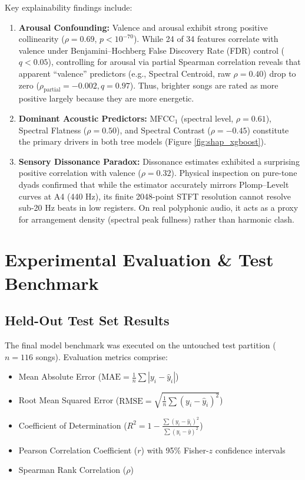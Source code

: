 \documentclass[conference]{IEEEtran}
\begin{document}
Key explainability findings include:
\begin{enumerate}
    \item \textbf{Arousal Confounding:} Valence and arousal exhibit strong positive collinearity ($\rho = 0.69$, $p < 10^{-70}$). While 24 of 34 features correlate with valence under Benjamini--Hochberg False Discovery Rate (FDR) control ($q < 0.05$), controlling for arousal via partial Spearman correlation reveals that apparent ``valence'' predictors (e.g., Spectral Centroid, raw $\rho = 0.40$) drop to zero ($\rho_{\text{partial}} = -0.002, q = 0.97$). Thus, brighter songs are rated as more positive largely because they are more energetic.
    \item \textbf{Dominant Acoustic Predictors:} $\text{MFCC}_1$ (spectral level, $\rho = 0.61$), Spectral Flatness ($\rho = 0.50$), and Spectral Contrast ($\rho = -0.45$) constitute the primary drivers in both tree models (Figure \ref{fig:shap_xgboost}).
    \item \textbf{Sensory Dissonance Paradox:} Dissonance estimates exhibited a surprising positive correlation with valence ($\rho = 0.32$). Physical inspection on pure-tone dyads confirmed that while the estimator accurately mirrors Plomp--Levelt curves at A4 (440 Hz), its finite 2048-point STFT resolution cannot resolve sub-20 Hz beats in low registers. On real polyphonic audio, it acts as a proxy for arrangement density (spectral peak fullness) rather than harmonic clash.
\end{enumerate}

\section{Experimental Evaluation \& Test Benchmark}

\subsection{Held-Out Test Set Results}
The final model benchmark was executed on the untouched test partition ($n = 116$ songs). Evaluation metrics comprise:
\begin{itemize}
    \item Mean Absolute Error ($\text{MAE} = \frac{1}{n}\sum |y_i - \hat{y}_i|$)
    \item Root Mean Squared Error ($\text{RMSE} = \sqrt{\frac{1}{n}\sum (y_i - \hat{y}_i)^2}$)
    \item Coefficient of Determination ($R^2 = 1 - \frac{\sum (y_i - \hat{y}_i)^2}{\sum (y_i - \bar{y})^2}$)
    \item Pearson Correlation Coefficient ($r$) with 95\% Fisher-$z$ confidence intervals
    \item Spearman Rank Correlation ($\rho$)
\end{itemize}
\end{document}
